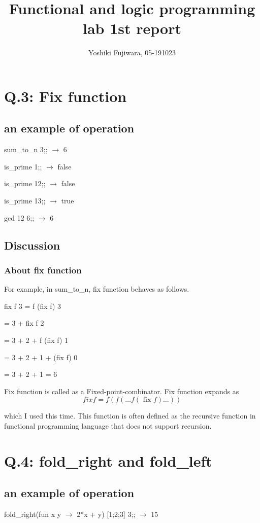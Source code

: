 \documentclass[uplatex,12pt]{jsarticle}
\title {Functional and logic programming lab 1st report}
\date{}
\begin{document}
\author{Yoshiki Fujiwara, 05-191023}
\maketitle

\section {Q.3: Fix function}
\subsection {an example of operation}
sum\_to\_n 3;; $\rightarrow $ 6

is\_prime 1;; $\rightarrow $ false

is\_prime 12;; $\rightarrow $ false

is\_prime 13;; $\rightarrow $ true

gcd 12 6;; $\rightarrow $ 6




\subsection{Discussion}
\subsubsection{About fix function}
For example, in sum\_to\_n, fix function behaves as follows.

fix f 3 = f (fix f) 3

= 3 + fix f 2

= 3 + 2 +  f (fix f) 1

= 3 + 2 + 1 + (fix f) 0

= 3 + 2 + 1 = 6


Fix function is called as a Fixed-point-combinator.
Fix function expands as
$$fix  f=f(f(\ldots f(\text { fix } f) \dots))$$


which I used this time. This function is often defined as the recursive function in functional programming language that does not support recursion.


\section {Q.4: fold\_right and fold\_left}
\subsection {an example of operation}
fold\_right(fun x y $\rightarrow$ 2*x + y) [1;2;3] 3;; $\rightarrow$ 15
\end{document}

